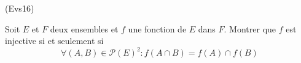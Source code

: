 \begin{tiny}(Evs16)\end{tiny} Soit $E$ et $F$ deux ensembles et $f$ une fonction de $E$ dans $F$. Montrer que $f$ est injective si et seulement si 
\begin{displaymath}
 \forall(A,B)\in \mathcal P(E)^2 : f(A\cap B) = f(A)\cap f(B)
\end{displaymath}
 
